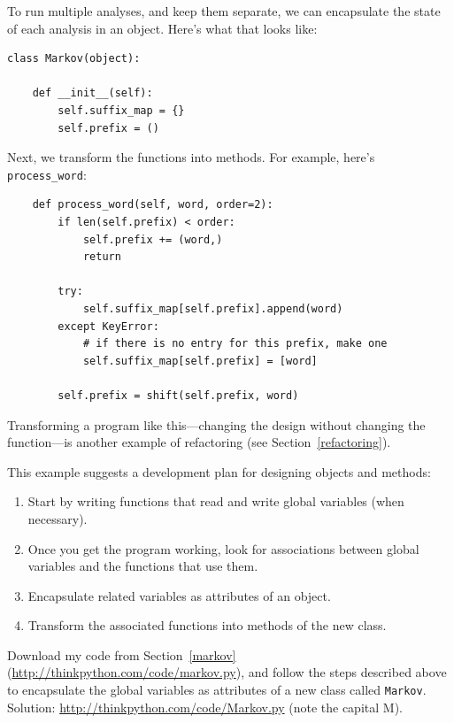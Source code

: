 \documentclass[10pt]{book}
\begin{document}
To run multiple analyses, and keep them separate, we can encapsulate
the state of each analysis in an object.
Here's what that looks like:

\begin{verbatim}
class Markov(object):

    def __init__(self):
        self.suffix_map = {}
        self.prefix = ()
\end{verbatim}

Next, we transform the functions into methods.  For example,
here's \verb"process_word":

\begin{verbatim}
    def process_word(self, word, order=2):
        if len(self.prefix) < order:
            self.prefix += (word,)
            return

        try:
            self.suffix_map[self.prefix].append(word)
        except KeyError:
            # if there is no entry for this prefix, make one
            self.suffix_map[self.prefix] = [word]

        self.prefix = shift(self.prefix, word)
\end{verbatim}

Transforming a program like this---changing the design without
changing the function---is another example of refactoring
(see Section~\ref{refactoring}).

This example suggests a development plan for designing objects and
methods:

\begin{enumerate}

\item Start by writing functions that read and write global
variables (when necessary).

\item Once you get the program working, look for associations
between global variables and the functions that use them.

\item Encapsulate related variables as attributes of an object.

\item Transform the associated functions into methods of the new
class.

\end{enumerate}


\begin{exercise}

Download my code from Section~\ref{markov}
(\url{http://thinkpython.com/code/markov.py}), and follow the steps described
above to encapsulate the global variables as attributes of a new class
called {\tt Markov}.  Solution: \url{http://thinkpython.com/code/Markov.py}
(note the capital M).

\end{exercise}
\end{document}
